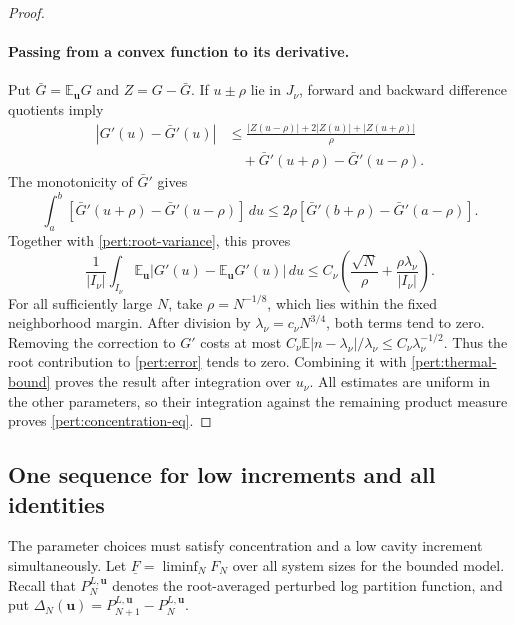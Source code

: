 \begin{proof}
\paragraph{Passing from a convex function to its derivative.}
Put
$\bar G=\mathbb E_{\mathbf u}G$ and $Z=G-\bar G$.  If $u\pm\rho$ lie
in $J_\nu$, forward and backward difference quotients imply
\begin{align*}
 |G'(u)-\bar G'(u)|
 &\leq\frac{|Z(u-\rho)|+2|Z(u)|+|Z(u+\rho)|}{\rho}\\
 &\quad+\bar G'(u+\rho)-\bar G'(u-\rho).
\end{align*}
The monotonicity of $\bar G'$ gives
\[
 \int_a^b[\bar G'(u+\rho)-\bar G'(u-\rho)]\,du
 \leq2\rho[\bar G'(b+\rho)-\bar G'(a-\rho)].
\]
Together with \eqref{pert:root-variance}, this proves
\begin{equation}
 \frac1{|I_\nu|}\int_{I_\nu}
 \mathbb E_{\mathbf u}|G'(u)-\mathbb E_{\mathbf u}G'(u)|\,du
 \leq C_\nu\left(\frac{\sqrt N}{\rho}
              +\frac{\rho\lambda_\nu}{|I_\nu|}\right).
 \label{pert:convex-bound}
\end{equation}
For all sufficiently large $N$, take $\rho=N^{-1/8}$, which lies
within the fixed neighborhood margin.  After division by
$\lambda_\nu=c_\nu N^{3/4}$, both terms tend to zero.  Removing the
correction to $G'$ costs at most
$C_\nu\mathbb E|n-\lambda_\nu|/\lambda_\nu
\leq C_\nu\lambda_\nu^{-1/2}$.  Thus the root contribution to
\eqref{pert:error} tends to zero.  Combining it with
\eqref{pert:thermal-bound} proves the result after integration over
$u_\nu$.  All estimates are uniform in the other parameters, so their
integration against the remaining product measure proves
\eqref{pert:concentration-eq}.
\end{proof}

\subsection{One sequence for low increments and all identities}

The parameter choices must satisfy concentration and a low cavity
increment simultaneously. Let $\underline F=\liminf_NF_N$ over all
system sizes for the bounded model. Recall that
$P_N^{L,\mathbf u}$ denotes the root-averaged perturbed log partition
function, and put
$\Delta_N(\mathbf u)=P_{N+1}^{L,\mathbf u}-P_N^{L,\mathbf u}$.

